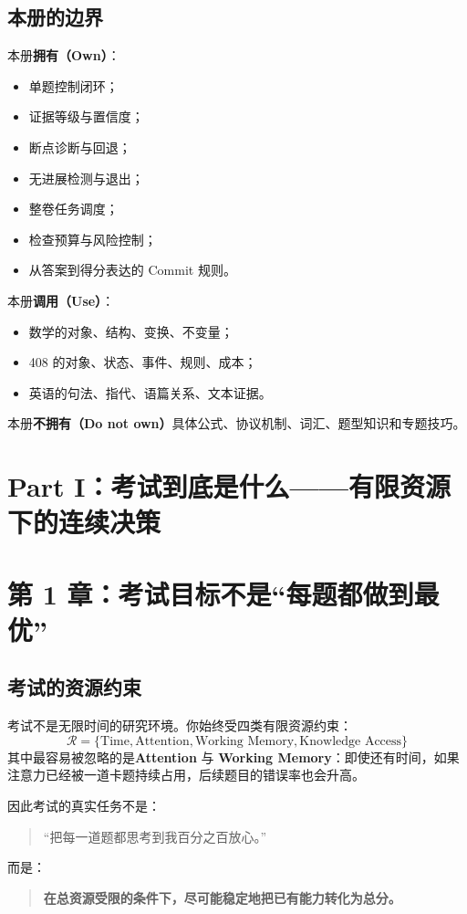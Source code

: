 \documentclass[11pt,a4paper]{ctexart}
\newcommand{\kw}[1]{\textbf{#1}}
\begin{document}
\subsection{本册的边界}
本册\kw{拥有（Own）}：
\begin{itemize}
  \item 单题控制闭环；
  \item 证据等级与置信度；
  \item 断点诊断与回退；
  \item 无进展检测与退出；
  \item 整卷任务调度；
  \item 检查预算与风险控制；
  \item 从答案到得分表达的 Commit 规则。
\end{itemize}

本册\kw{调用（Use）}：
\begin{itemize}
  \item 数学的对象、结构、变换、不变量；
  \item 408 的对象、状态、事件、规则、成本；
  \item 英语的句法、指代、语篇关系、文本证据。
\end{itemize}

本册\kw{不拥有（Do not own）}具体公式、协议机制、词汇、题型知识和专题技巧。

\newpage
\section{Part I：考试到底是什么——有限资源下的连续决策}

\section{第 1 章：考试目标不是“每题都做到最优”}

\subsection{考试的资源约束}
考试不是无限时间的研究环境。你始终受四类有限资源约束：
\[
\boxed{
\mathcal R=
\{\text{Time},\text{Attention},\text{Working Memory},\text{Knowledge Access}\}
}
\]
其中最容易被忽略的是\kw{Attention} 与 \kw{Working Memory}：即使还有时间，如果注意力已经被一道卡题持续占用，后续题目的错误率也会升高。

因此考试的真实任务不是：
\begin{quote}
“把每一道题都思考到我百分之百放心。”
\end{quote}
而是：
\begin{quote}
\kw{在总资源受限的条件下，尽可能稳定地把已有能力转化为总分。}
\end{quote}
\end{document}
